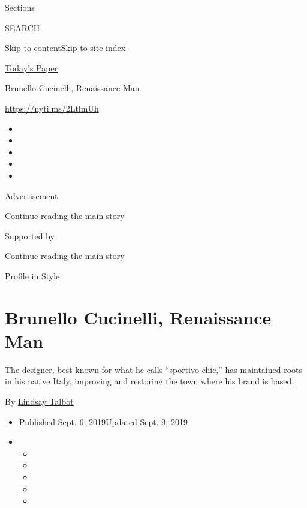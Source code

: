 Sections

SEARCH

\protect\hyperlink{site-content}{Skip to
content}\protect\hyperlink{site-index}{Skip to site index}

\href{https://myaccount.nytimes3xbfgragh.onion/auth/login?response_type=cookie\&client_id=vi}{}

\href{https://www.nytimes3xbfgragh.onion/section/todayspaper}{Today's
Paper}

Brunello Cucinelli, Renaissance Man

\url{https://nyti.ms/2LtlmUh}

\begin{itemize}
\item
\item
\item
\item
\item
\end{itemize}

Advertisement

\protect\hyperlink{after-top}{Continue reading the main story}

Supported by

\protect\hyperlink{after-sponsor}{Continue reading the main story}

Profile in Style

\hypertarget{brunello-cucinelli-renaissance-man}{%
\section{Brunello Cucinelli, Renaissance
Man}\label{brunello-cucinelli-renaissance-man}}

The designer, best known for what he calls ``sportivo chic,'' has
maintained roots in his native Italy, improving and restoring the town
where his brand is based.

By \href{https://www.nytimes3xbfgragh.onion/by/lindsay-talbot}{Lindsay
Talbot}

\begin{itemize}
\item
  Published Sept. 6, 2019Updated Sept. 9, 2019
\item
  \begin{itemize}
  \item
  \item
  \item
  \item
  \item
  \end{itemize}
\end{itemize}

